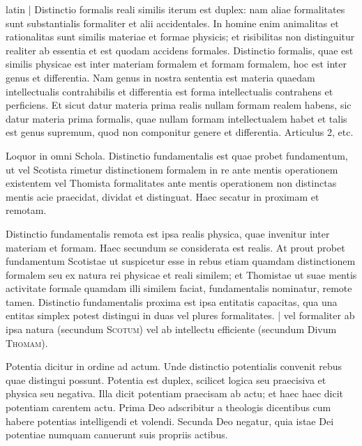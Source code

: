 \begin{otherlanguage*}{latin}
\pstart
\textnormal{|} Distinctio formalis reali similis iterum est duplex:
nam aliae formalitates sunt substantialis formaliter et alii accidentales. In homine enim animalitas et rationalitas sunt similis materiae et formae physicis; et risibilitas non distinguitur realiter ab essentia et est quodam accidens formales. Distinctio formalis, quae est similis physicae est inter materiam formalem et formam formalem, hoc est inter genus et differentia. Nam genus in nostra sententia est materia quaedam intellectualis contrahibilis et differentia est forma intellectualis contrahens et perficiens. Et sicut datur materia prima realis nullam formam realem habens, sic datur materia prima formalis, quae nullam formam intellectualem habet et talis est genus supremum, quod non componitur genere et differentia. Articulus 2, etc. 
\pend

\pstart
{}
\pend

\pstart
Loquor in omni Schola. Distinctio fundamentalis est quae probet fundamentum, ut vel Scotista rimetur distinctionem formalem in re ante mentis operationem existentem vel Thomista formalitates ante mentis operationem non distinctas mentis acie praecidat, dividat et distinguat. Haec secatur in proximam et remotam. 
\pend

\pstart
Distinctio fundamentalis remota est ipsa realis physica, quae invenitur inter materiam et formam. Haec secundum se considerata est realis. Αt prout probet fundamentum Scotistae ut suspicetur esse in rebus etiam quamdam distinctionem formalem seu ex natura rei physicae et reali similem; et Thomistae ut suae mentis activitate formale quamdam illi similem faciat, fundamentalis nominatur, remote tamen. Distinctio fundamentalis proxima est ipsa entitatis capacitas, qua una entitas simplex potest distingui in duas vel plures formalitates. \textnormal{|} vel formaliter ab ipsa natura (secundum \textsc{Scotum}) vel ab intellectu efficiente (secundum Divum \textsc{Thomam}). 
\pend

\pstart
Potentia dicitur in ordine ad actum. Unde distinctio potentialis convenit rebus quae distingui possunt. Potentia est duplex, scilicet logica seu praecisiva et physica seu negativa. Illa dicit potentiam praecisam ab actu; et haec haec dicit potentiam carentem actu. Prima Deo adscribitur a theologis dicentibus cum habere potentias intelligendi et volendi. Secunda Deo negatur, quia istae Dei potentiae numquam canuerunt suis propriis actibus. 
\pend


\end{otherlanguage*}
